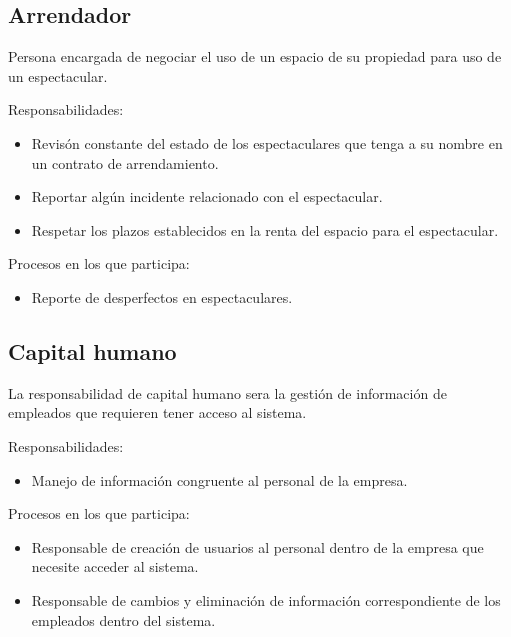\begin{Usuario}{\subsection{Arrendador}}{
    Persona encargada de negociar el uso de un espacio de su propiedad para uso de un espectacular.\\
}
    \item[Responsabilidades:] \cdtEmpty
    \begin{itemize}
        \item Revisón constante del estado de los espectaculares que tenga a su nombre en un contrato de arrendamiento.
        \item Reportar algún incidente relacionado con el espectacular.
        \item Respetar los plazos establecidos en la renta del espacio para el espectacular.
    \end{itemize}
    
    \item[Procesos en los que participa:] \cdtEmpty
    \begin{itemize}
        \item Reporte de desperfectos en espectaculares.
    \end{itemize}
\end{Usuario}

\begin{Usuario}{\subsection{Capital humano}}{
La responsabilidad de capital humano sera la gestión de información de empleados que requieren tener acceso al sistema.
}
\item[Responsabilidades:]\cdtEmpty
\begin{itemize}
    \item Manejo de información congruente al personal de la empresa.
\end{itemize}
\item[Procesos en los que participa:]\cdtEmpty
\begin{itemize}
    \item Responsable de creación de usuarios al personal dentro de la empresa que necesite acceder al sistema.
    \item Responsable de cambios y eliminación de información correspondiente de los empleados dentro del sistema.
\end{itemize}
\end{Usuario}

